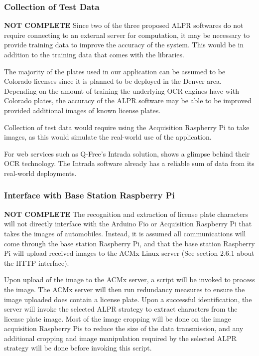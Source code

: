 \documentclass[11pt, oneside, fullpage, doublespace]{article}
\begin{document}
\subsubsection{Collection of Test Data}
{\color{red}\textbf{NOT COMPLETE}}
Since two of the three proposed ALPR softwares do not require connecting to an external server for computation, it may be necessary to provide training data to improve the accuracy of the system. This would be in addition to the training data that comes with the libraries.

The majority of the plates used in our application can be assumed to be Colorado licenses since it is planned to be deployed in the Denver area. Depending on the amount of training the underlying OCR engines have with Colorado plates, the accuracy of the ALPR software may be able to be improved provided additional images of known license plates.

Collection of test data would require using the Acquisition Raspberry Pi to take images, as this would simulate the real-world use of the application.

For web services such as Q-Free's Intrada solution, \cite{intrada2014} shows a glimpse behind their OCR technology. The Intrada software already has a reliable sum of data from its real-world deployments.

\subsubsection{Interface with Base Station Raspberry Pi}
{\color{red}\textbf{NOT COMPLETE}}
The recognition and extraction of license plate characters will not directly interface with the Arduino Fio or Acquisition Raspberry Pi that takes the images of automobiles. Instead, it is assumed all communications will come through the base station Raspberry Pi, and that the base station Raspberry Pi will upload received images to the ACMx Linux server (See section 2.6.1 about the HTTP interface).

Upon upload of the image to the ACMx server, a script will be invoked to process the image. The ACMx server will then run redundancy measures to ensure the image uploaded does contain a license plate. Upon a successful identification, the server will invoke the selected ALPR strategy to extract characters from the license plate image. Most of the image cropping will be done on the image acquisition Raspberry Pis to reduce the size of the data transmission, and any additional cropping and image manipulation required by the selected ALPR strategy will be done before invoking this script.
\end{document}
